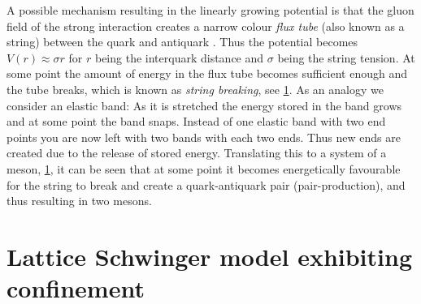 \documentclass[../main.tex]{subfiles} %
\begin{document}
\begin{figure}[t]
    \label{fig:QuarkConfinement}
\end{figure}

A possible mechanism resulting in the linearly growing potential is that the gluon field of the strong interaction creates a narrow colour \emph{flux tube} (also known as a string) between the quark and antiquark \cite{brandt_effectiveStringDescriptionOfConfiningFluxTubes_2016}. Thus the potential becomes $V(r) \approx \sigma r$ for $r$ being the interquark distance and $\sigma$ being the string tension. At some point the amount of energy in the flux tube becomes sufficient enough and the tube breaks, which is known as \emph{string breaking}, see \cref{fig:QuarkConfinement}. As an analogy we consider an elastic band: As it is stretched the energy stored in the band grows and at some point the band snaps. Instead of one elastic band with two end points you are now left with two bands with each two ends. Thus new ends are created due to the release of stored energy. Translating this to a system of a meson, \cref{fig:QuarkConfinement}, it can be seen that at some point it becomes energetically favourable for the string to break and create a quark-antiquark pair (pair-production), and thus resulting in two mesons.





\section{Lattice Schwinger model exhibiting confinement} \label{sec:LatticeSchwingerModelAndConfienemt}
\end{document}
